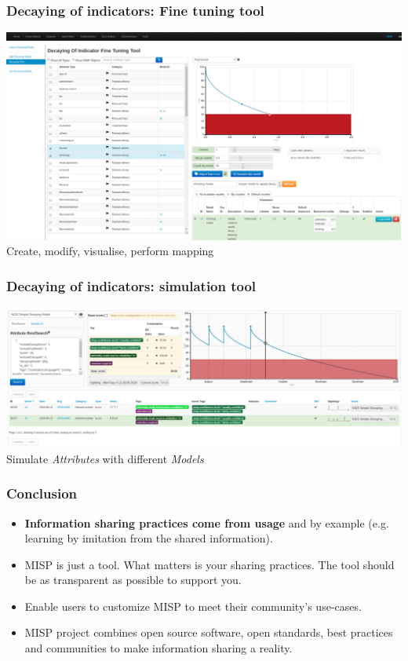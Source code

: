 \begin{frame}
    \frametitle{Decaying of indicators: Fine tuning tool}
    \includegraphics[width=1.00\linewidth]{decaying-tool.png}
    Create, modify, visualise, perform mapping
\end{frame}

\begin{frame}
    \frametitle{Decaying of indicators: simulation tool}
    \includegraphics[width=1.00\linewidth]{decaying-simulation.png}
    Simulate \textit{Attributes} with different \textit{Models}
\end{frame}


\begin{frame}
        \frametitle{Conclusion}
        \begin{itemize}
                \item {\bf Information sharing practices come from usage} and by example (e.g. learning by imitation from the shared information).
                \item MISP is just a tool. What matters is your sharing practices. The tool should be as transparent as possible to support you.
                \item Enable users to customize MISP to meet their community's use-cases.
                \item MISP project combines open source software, open standards, best practices and communities to make information sharing a reality.
        \end{itemize}
\end{frame}

